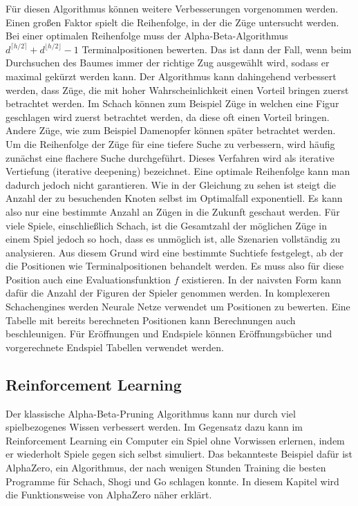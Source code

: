 Für diesen Algorithmus können weitere Verbesserungen vorgenommen werden. Einen großen Faktor spielt die Reihenfolge, in der die Züge untersucht werden. Bei einer optimalen Reihenfolge muss der Alpha-Beta-Algorithmus $d^{\lceil h/2 \rceil} + d^{\lfloor h/2 \rfloor} - 1$ Terminalpositionen bewerten. \cite{knuth_analysis_1975} Das ist dann der Fall, wenn beim Durchsuchen des Baumes immer der richtige Zug ausgewählt wird, sodass er maximal gekürzt werden kann. Der Algorithmus kann dahingehend verbessert werden, dass Züge, die mit hoher Wahrscheinlichkeit einen Vorteil bringen zuerst betrachtet werden. Im Schach können zum Beispiel Züge in welchen eine Figur geschlagen wird zuerst betrachtet werden, da diese oft einen Vorteil bringen. Andere Züge, wie zum Beispiel Damenopfer können später betrachtet werden.
Um die Reihenfolge der Züge für eine tiefere Suche zu verbessern, wird häufig zunächst eine flachere Suche durchgeführt. Dieses Verfahren wird als iterative Vertiefung (iterative deepening) bezeichnet. 
Eine optimale Reihenfolge kann man dadurch jedoch nicht garantieren. Wie in der Gleichung zu sehen ist steigt die Anzahl der zu besuchenden Knoten selbst im Optimalfall exponentiell. Es kann also nur eine bestimmte Anzahl an Zügen in die Zukunft geschaut werden. Für viele Spiele, einschließlich Schach, ist die Gesamtzahl der möglichen Züge in einem Spiel jedoch so hoch, dass es unmöglich ist, alle Szenarien vollständig zu analysieren. Aus diesem Grund wird eine bestimmte Suchtiefe festgelegt, ab der die Positionen wie Terminalpositionen behandelt werden.\cite{knuth_analysis_1975} Es muss also für diese Position auch eine Evaluationsfunktion $f$ existieren. In der naivsten Form kann dafür die Anzahl der Figuren der Spieler genommen werden. In komplexeren Schachengines werden Neurale Netze verwendet um Positionen zu bewerten. Eine Tabelle mit bereits berechneten Positionen kann Berechnungen auch beschleunigen. Für Eröffnungen und Endspiele können Eröffnungsbücher und vorgerechnete Endspiel Tabellen verwendet werden.\cite{silver_mastering_2017}

\subsection{Reinforcement Learning}
Der klassische Alpha-Beta-Pruning Algorithmus kann nur durch viel spielbezogenes Wissen verbessert werden. Im Gegensatz dazu kann im Reinforcement Learning ein Computer ein Spiel ohne Vorwissen erlernen, indem er wiederholt Spiele gegen sich selbst simuliert. Das bekannteste Beispiel dafür ist AlphaZero, ein Algorithmus, der nach wenigen Stunden Training die besten Programme für Schach, Shogi und Go schlagen konnte. \cite{silver_mastering_2017} In diesem Kapitel wird die Funktionsweise von AlphaZero näher erklärt.

